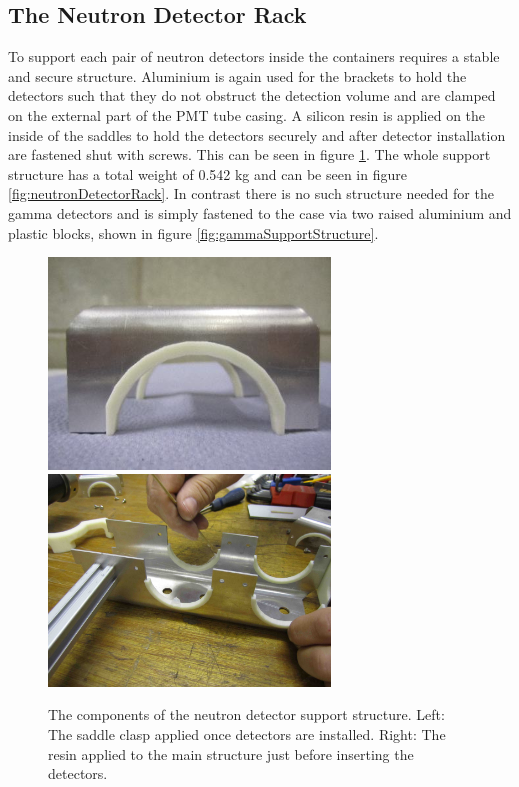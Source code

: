 \subsection{The Neutron Detector Rack}
To support each pair of neutron detectors inside the containers requires a stable and secure structure. Aluminium is again used for the brackets to hold the detectors such that they do not obstruct the detection volume and are clamped on the external part of the PMT tube casing. A silicon resin is applied on the inside of the saddles to hold the detectors securely and after detector installation are fastened shut with screws. This can be seen in figure \ref{fig:neutronDetectorRackImages}. The whole support structure has a total weight of 0.542 kg and can be seen in figure \ref{fig:neutronDetectorRack}. In contrast there is no such structure needed for the gamma detectors and is simply fastened to the case via two raised aluminium and plastic blocks, shown in figure \ref{fig:gammaSupportStructure}.

\begin{figure}[htbp]
\begin{center}
\includegraphics[width=75mm]{Chapter6/figures/neutronDetectorRack1.png}
\includegraphics[width=75mm]{Chapter6/figures/neutronDetectorRack2.jpg}
\caption{The components of the neutron detector support structure. Left: The saddle clasp applied once detectors are installed. Right: The resin applied to the main structure just before inserting the detectors.}
\label{fig:neutronDetectorRackImages}
\end{center}
\end{figure}

